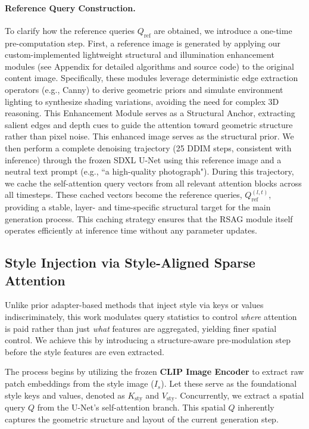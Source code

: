 \paragraph{Reference Query Construction.}
To clarify how the reference queries $Q_\text{ref}$ are obtained, we introduce a one-time pre-computation step. First, a reference image is generated by applying our custom-implemented lightweight structural and illumination enhancement modules (see Appendix for detailed algorithms and source code) to the original content image. Specifically, these modules leverage deterministic edge extraction operators (e.g., Canny) to derive geometric priors and simulate environment lighting to synthesize shading variations, avoiding the need for complex 3D reasoning. This Enhancement Module serves as a Structural Anchor, extracting salient edges and depth cues to guide the attention toward geometric structure rather than pixel noise. This enhanced image serves as the structural prior. We then perform a complete denoising trajectory (25 DDIM steps, consistent with inference) through the frozen SDXL U-Net using this reference image and a neutral text prompt (e.g., ``a high-quality photograph"). During this trajectory, we cache the self-attention query vectors from all relevant attention blocks across all timesteps. These cached vectors become the reference queries, $Q_\text{ref}^{(l,t)}$, providing a stable, layer- and time-specific structural target for the main generation process. This caching strategy ensures that the RSAG module itself operates efficiently at inference time without any parameter updates.

\subsection{Style Injection via Style-Aligned Sparse Attention}

Unlike prior adapter-based methods that inject style via keys or values indiscriminately, this work modulates query statistics to control \textit{where} attention is paid rather than just \textit{what} features are aggregated, yielding finer spatial control. We achieve this by introducing a structure-aware pre-modulation step before the style features are even extracted.

The process begins by utilizing the frozen \textbf{CLIP Image Encoder} to extract raw patch embeddings from the style image ($I_s$). Let these serve as the foundational style keys and values, denoted as $K_{\text{sty}}$ and $V_{\text{sty}}$. Concurrently, we extract a spatial query $Q$ from the U-Net's self-attention branch. This spatial $Q$ inherently captures the geometric structure and layout of the current generation step. 

